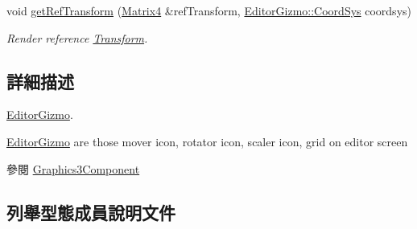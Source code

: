 \begin{DoxyCompactItemize}
void \hyperlink{class_magnum_1_1_editor_gizmo_a79d96c8cb5b98f708c5a1c39f7f5b7e4}{get\+Ref\+Transform} (\hyperlink{class_magnum_1_1_matrix4}{Matrix4} \&ref\+Transform, \hyperlink{class_magnum_1_1_editor_gizmo_ac5e0cb8d26cb03df33fe145a7b3ef910}{Editor\+Gizmo\+::\+Coord\+Sys} coordsys)
\begin{DoxyCompactList}\small\item\em Render reference \hyperlink{class_magnum_1_1_transform}{Transform}. \end{DoxyCompactList}\end{DoxyCompactItemize}


\subsection{詳細描述}
\hyperlink{class_magnum_1_1_editor_gizmo}{Editor\+Gizmo}. 

\hyperlink{class_magnum_1_1_editor_gizmo}{Editor\+Gizmo} are those mover icon, rotator icon, scaler icon, grid on editor screen \begin{DoxySeeAlso}{參閱}
\hyperlink{class_magnum_1_1_graphics3_component}{Graphics3\+Component} 
\end{DoxySeeAlso}


\subsection{列舉型態成員說明文件}
